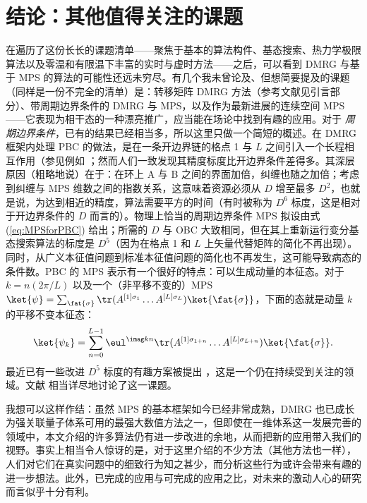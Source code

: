 \section{结论：其他值得关注的课题}
在遍历了这份长长的课题清单——聚焦于基本的算法构件、基态搜索、热力学极限算法以及零温和有限温下丰富的实时与虚时方法——之后，可以看到 DMRG 与基于 MPS 的算法的可能性还远未穷尽。有几个我未曾论及、但想简要提及的课题（同样是一份不完全的清单）是：转移矩阵 DMRG 方法（参考文献见引言部分）、带周期边界条件的 DMRG 与 MPS，以及作为最新进展的连续空间 MPS\cite{Verstraete10}——它表现为相干态的一种漂亮推广，应当能在场论中找到有趣的应用。对于 {\em 周期边界条件}，已有的结果已经相当多，所以这里只做一个简短的概述。在 DMRG 框架内处理 PBC 的做法，是在一条开边界链的格点 1 与 $L$ 之间引入一个长程相互作用（参见例如 \cite{Schmitteckert96,Rapsch99,Meden03a,Meden03b}；然而人们一致发现其精度标度比开边界条件差得多。其深层原因（粗略地说）在于：在环上 A 与 B 之间的界面加倍，纠缠也随之加倍；考虑到纠缠与 MPS 维数之间的指数关系，这意味着资源必须从 $D$ 增至最多 $D^2$，也就是说，为达到相近的精度，算法需要平方的时间（有时被称为 $D^6$ 标度，这是相对于开边界条件的 $D$ 而言的）。物理上恰当的周期边界条件 MPS 拟设由式 (\ref{eq:MPSforPBC}) 给出；所需的 $D$ 与 OBC 大致相同，但在其上重新运行变分基态搜索算法的标度是 $D^5$（因为在格点 1 和 $L$ 上矢量代替矩阵的简化不再出现）\cite{VerstraetePorras04}。同时，从广义本征值问题到标准本征值问题的简化也不再发生，这可能导致病态的条件数。PBC 的 MPS 表示有一个很好的特点：可以生成动量的本征态。对于 $k = n (2\pi/L)$ 以及一个（非平移不变的）MPS $\ket{\psi} = \sum_{{\fat{\sigma}}} \tr (A^{[1]\sigma_1} \ldots A^{[L]\sigma_L}) \ket{\fat{\sigma}}$，下面的态就是动量 $k$ 的平移不变本征态：\cite{Porras06}
\begin{equation}
\ket{\psi_k} = \sum_{n=0}^{L-1} \eul^{\imag k n}  \tr (A^{[1]\sigma_{1+n}} \ldots A^{[L]\sigma_{L+n}}) \ket{\fat{\sigma}} .
\end{equation}
最近已有一些改进 $D^5$ 标度的有趣方案被提出 \cite{Pippan10,Pirvu10}，这是一个仍在持续受到关注的领域。文献 \cite{VerstraeteMurg08} 相当详尽地讨论了这一课题。

我想可以这样作结：虽然 MPS 的基本框架如今已经非常成熟，DMRG 也已成长为强关联量子体系可用的最强大数值方法之一，但即使在一维体系这一发展完善的领域中，本文介绍的许多算法仍有进一步改进的余地，从而把新的应用带入我们的视野。事实上相当令人惊讶的是，对于这里介绍的不少方法（其他方法也一样），人们对它们在真实问题中的细致行为知之甚少，而分析这些行为或许会带来有趣的进一步想法。此外，已完成的应用与可完成的应用之比，对未来的激动人心的研究而言似乎十分有利。

